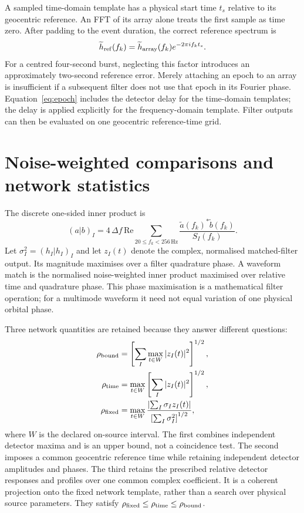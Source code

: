 \documentclass[11pt,a4paper]{article}
\begin{document}
A sampled time-domain template has a physical start time $t_s$ relative to its geocentric reference. An FFT of its array alone treats the first sample as time zero. After padding to the event duration, the correct reference spectrum is
\begin{equation}
 \widetilde h_{\rm ref}(f_k)=\widetilde h_{\rm array}(f_k)e^{-2\pi i f_kt_s}.
 \label{eq:epoch}
\end{equation}
For a centred four-second burst, neglecting this factor introduces an approximately two-second reference error. Merely attaching an epoch to an array is insufficient if a subsequent filter does not use that epoch in its Fourier phase. Equation~\ref{eq:epoch} includes the detector delay for the time-domain templates; the delay is applied explicitly for the frequency-domain template. Filter outputs can then be evaluated on one geocentric reference-time grid.

\section{Noise-weighted comparisons and network statistics}
The discrete one-sided inner product is
\begin{equation}
 (a|b)_I=4\,\Delta f\,\mathrm{Re}\sum_{20\leq f_k<256\,\mathrm{Hz}}
 \frac{\widetilde a(f_k)^*\widetilde b(f_k)}{S_I(f_k)}.
\end{equation}
Let $\sigma_I^2=(h_I|h_I)_I$ and let $z_I(t)$ denote the complex, normalised matched-filter output. Its magnitude maximises over a filter quadrature phase. A waveform match is the normalised noise-weighted inner product maximised over relative time and quadrature phase. This phase maximisation is a mathematical filter operation; for a multimode waveform it need not equal variation of one physical orbital phase.

Three network quantities are retained because they answer different questions:
\begin{align}
 \rho_{\rm bound}&=\left[\sum_I\max_{t\in W}|z_I(t)|^2\right]^{1/2},\\
 \rho_{\rm time}&=\max_{t\in W}\left[\sum_I|z_I(t)|^2\right]^{1/2},\\
 \rho_{\rm fixed}&=\max_{t\in W}
 \frac{\left|\sum_I\sigma_I z_I(t)\right|}{\left[\sum_I\sigma_I^2\right]^{1/2}},
 \label{eq:coherent}
\end{align}
where $W$ is the declared on-source interval. The first combines independent detector maxima and is an upper bound, not a coincidence test. The second imposes a common geocentric reference time while retaining independent detector amplitudes and phases. The third retains the prescribed relative detector responses and profiles over one common complex coefficient. It is a coherent projection onto the fixed network template, rather than a search over physical source parameters. They satisfy
$\rho_{\rm fixed}\leq\rho_{\rm time}\leq\rho_{\rm bound}$.
\end{document}
